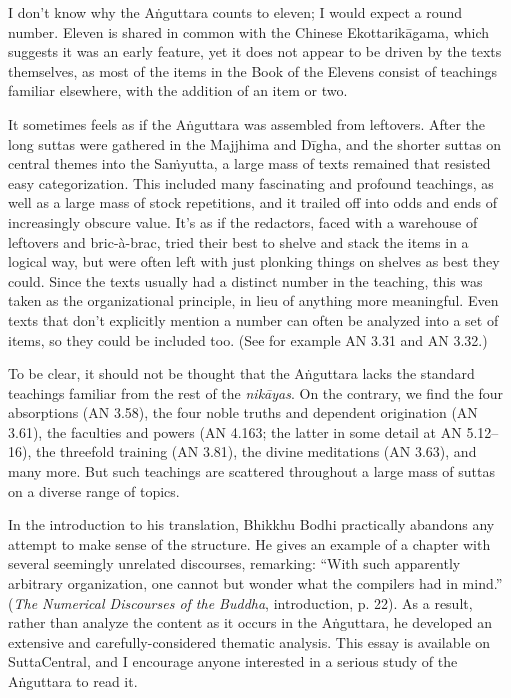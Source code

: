 \documentclass[12pt,openany]{book}%
\begin{document}
I don’t know why the \textsanskrit{Aṅguttara} counts to eleven; I would expect a round number. Eleven is shared in common with the Chinese \textsanskrit{Ekottarikāgama}, which suggests it was an early feature, yet it does not appear to be driven by the texts themselves, as most of the items in the Book of the Elevens consist of teachings familiar elsewhere, with the addition of an item or two.

It sometimes feels as if the \textsanskrit{Aṅguttara} was assembled from leftovers. After the long suttas were gathered in the Majjhima and \textsanskrit{Dīgha}, and the shorter suttas on central themes into the \textsanskrit{Saṁyutta}, a large mass of texts remained that resisted easy categorization. This included many fascinating and profound teachings, as well as a large mass of stock repetitions, and it trailed off into odds and ends of increasingly obscure value. It’s as if the redactors, faced with a warehouse of leftovers and bric-à-brac, tried their best to shelve and stack the items in a logical way, but were often left with just plonking things on shelves as best they could. Since the texts usually had a distinct number in the teaching, this was taken as the organizational principle, in lieu of anything more meaningful. Even texts that don’t explicitly mention a number can often be analyzed into a set of items, so they could be included too. (See for example AN 3.31 and AN 3.32.)

To be clear, it should not be thought that the \textsanskrit{Aṅguttara} lacks the standard teachings familiar from the rest of the \textit{\textsanskrit{nikāyas}}. On the contrary, we find the four absorptions (AN 3.58), the four noble truths and dependent origination (AN 3.61), the faculties and powers (AN 4.163; the latter in some detail at AN 5.12–16), the threefold training (AN 3.81), the divine meditations (AN 3.63), and many more. But such teachings are scattered throughout a large mass of suttas on a diverse range of topics.

In the introduction to his translation, Bhikkhu Bodhi practically abandons any attempt to make sense of the structure. He gives an example of a chapter with several seemingly unrelated discourses, remarking: “With such apparently arbitrary organization, one cannot but wonder what the compilers had in mind.” (\textit{The Numerical Discourses of the Buddha}, introduction, p. 22). As a result, rather than analyze the content as it occurs in the \textsanskrit{Aṅguttara}, he developed an extensive and carefully-considered thematic analysis. This essay is available on SuttaCentral, and I encourage anyone interested in a serious study of the \textsanskrit{Aṅguttara} to read it.
\end{document}
